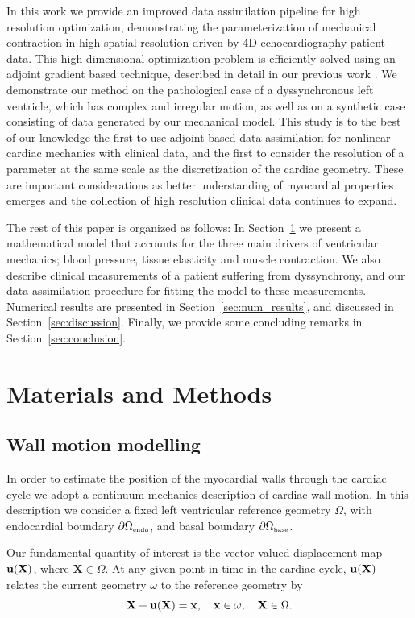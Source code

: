 In this work we provide an improved data assimilation pipeline for high resolution optimization,
demonstrating the parameterization of mechanical contraction in high spatial resolution 
driven by 4D echocardiography patient data. This high dimensional optimization problem 
is efficiently solved using an adjoint gradient based technique, described in detail 
in our previous work \cite{balaban2016adjoint}. We demonstrate our method on the pathological 
case of a dyssynchronous left ventricle, which has complex and irregular motion, 
as well as on a synthetic case consisting of data generated by our mechanical model. 
This study is to the best of our knowledge the first to use adjoint-based data assimilation 
for nonlinear cardiac mechanics with clinical data, and the first to consider the 
resolution of a parameter at the same scale as the discretization of the cardiac geometry.
These are important considerations as better understanding of myocardial properties 
emerges and the collection of high resolution clinical data continues to expand.

The rest of this paper is organized as follows: In
Section~\ref{sec:methods} we present a mathematical model that
accounts for the three main drivers of ventricular mechanics; blood
pressure, tissue elasticity and muscle contraction.  
We also describe clinical measurements of a patient suffering from dyssynchrony, and our data assimilation procedure
for fitting the model to these measurements.
Numerical results are presented in Section~\ref{sec:num_results}, and discussed in
Section~\ref{sec:discussion}. Finally, we provide some concluding
remarks in Section~\ref{sec:conclusion}.


\section{Materials and Methods}
\label{sec:methods}

\subsection{Wall motion modelling}

\label{sec:wall_motion}
In order to estimate the position of the myocardial walls through
the cardiac cycle we adopt a continuum mechanics description of
cardiac wall motion. In this description we consider a fixed left
ventricular reference geometry $\Omega$, with endocardial boundary
$\partial \Omega_{ \textnormal{\tiny \text{endo}}}$, and basal boundary $\partial \Omega_{\textnormal{\tiny\text{base}}}$.

Our fundamental quantity of interest is the vector valued displacement
map $\mathbf{u}(\mathbf{X})$, where $\mathbf{X} \in \Omega$.  At any given
point in time in the cardiac cycle, $\mathbf{u}(\mathbf{X})$ relates
the current geometry $\omega$ to the reference geometry by
 \begin{equation}
{\bf X} + {\bf u}({\bf X}) = {\bf x}, \quad {\bf x} \in \omega, \quad {\bf X} \in \Omega. 
\end{equation}

